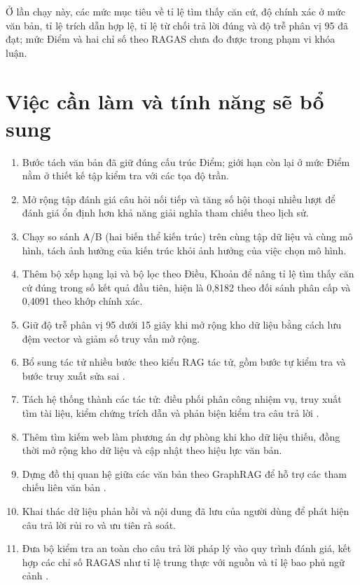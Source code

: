 \documentclass[12pt,a4paper,oneside]{report}
\begin{document}
Ở lần chạy này, các mức mục tiêu về tỉ lệ tìm thấy căn cứ, độ chính xác ở mức văn bản, tỉ lệ trích dẫn hợp lệ, tỉ lệ từ chối trả lời đúng và độ trễ phân vị 95 đã đạt; mức Điểm và hai chỉ số theo RAGAS chưa đo được trong phạm vi khóa luận.

\section*{Việc cần làm và tính năng sẽ bổ sung}
\begin{enumerate}
  \item Bước tách văn bản đã giữ đúng cấu trúc Điểm; giới hạn còn lại ở mức Điểm nằm ở thiết kế tập kiểm tra với các tọa độ trần.
  \item Mở rộng tập đánh giá câu hỏi nối tiếp và tăng số hội thoại nhiều lượt để đánh giá ổn định hơn khả năng giải nghĩa tham chiếu theo lịch sử.
  \item Chạy so sánh A/B (hai biến thể kiến trúc) trên cùng tập dữ liệu và cùng mô hình, tách ảnh hưởng của kiến trúc khỏi ảnh hưởng của việc chọn mô hình.
  \item Thêm bộ xếp hạng lại và bộ lọc theo Điều, Khoản để nâng tỉ lệ tìm thấy căn cứ đúng trong số kết quả đầu tiên, hiện là 0,8182 theo đối sánh phân cấp và 0,4091 theo khớp chính xác.
  \item Giữ độ trễ phân vị 95 dưới 15 giây khi mở rộng kho dữ liệu bằng cách lưu đệm vector và giảm số truy vấn mở rộng.
  \item Bổ sung tác tử nhiều bước theo kiểu RAG tác tử, gồm bước tự kiểm tra và bước truy xuất sửa sai \cite{agentic_rag_survey}.
  \item Tách hệ thống thành các tác tử: điều phối phân công nhiệm vụ, truy xuất tìm tài liệu, kiểm chứng trích dẫn và phản biện kiểm tra câu trả lời \cite{agentic_rag_survey,agentic_legal_challenge}.
  \item Thêm tìm kiếm web làm phương án dự phòng khi kho dữ liệu thiếu, đồng thời mở rộng kho dữ liệu và cập nhật theo hiệu lực văn bản.
  \item Dựng đồ thị quan hệ giữa các văn bản theo GraphRAG để hỗ trợ các tham chiếu liên văn bản \cite{graphrag_edge_2024}.
  \item Khai thác dữ liệu phản hồi và nội dung đã lưu của người dùng để phát hiện câu trả lời rủi ro và ưu tiên rà soát.
  \item Đưa bộ kiểm tra an toàn cho câu trả lời pháp lý vào quy trình đánh giá, kết hợp các chỉ số RAGAS như tỉ lệ trung thực với nguồn và tỉ lệ bao phủ ngữ cảnh \cite{ragas_metrics}.
\end{enumerate}
\end{document}
